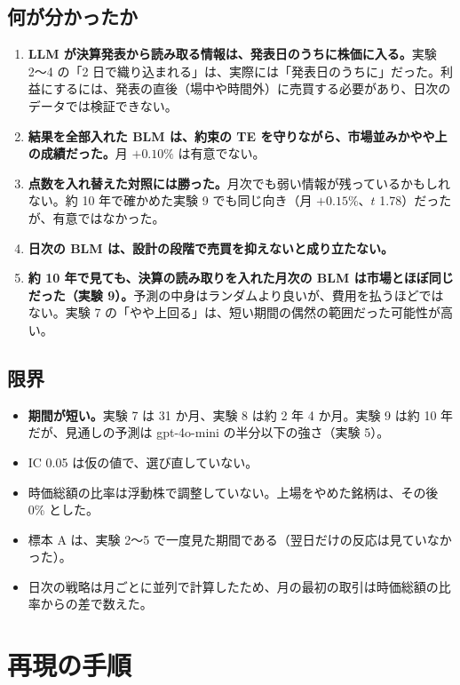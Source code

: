 \documentclass[xelatex,ja=standard,jafont=haranoaji,a4paper,10pt,openany]{bxjsreport}
\begin{document}
\section{何が分かったか}

\begin{enumerate}
\item \textbf{LLM が決算発表から読み取る情報は、発表日のうちに株価に入る。}実験 2〜4 の「2 日で織り込まれる」は、実際には「発表日のうちに」だった。利益にするには、発表の直後（場中や時間外）に売買する必要があり、日次のデータでは検証できない。
\item \textbf{結果を全部入れた BLM は、約束の TE を守りながら、市場並みかやや上の成績だった。}月 $+0.10\%$ は有意でない。
\item \textbf{点数を入れ替えた対照には勝った。}月次でも弱い情報が残っているかもしれない。約 10 年で確かめた実験 9 でも同じ向き（月 $+0.15\%$、$t$ 1.78）だったが、有意ではなかった。
\item \textbf{日次の BLM は、設計の段階で売買を抑えないと成り立たない。}
\item \textbf{約 10 年で見ても、決算の読み取りを入れた月次の BLM は市場とほぼ同じだった（実験 9）。}予測の中身はランダムより良いが、費用を払うほどではない。実験 7 の「やや上回る」は、短い期間の偶然の範囲だった可能性が高い。
\end{enumerate}

\section{限界}

\begin{itemize}
\item \textbf{期間が短い。}実験 7 は 31 か月、実験 8 は約 2 年 4 か月。実験 9 は約 10 年だが、見通しの予測は gpt-4o-mini の半分以下の強さ（実験 5）。
\item IC 0.05 は仮の値で、選び直していない。
\item 時価総額の比率は浮動株で調整していない。上場をやめた銘柄は、その後 0\% とした。
\item 標本 A は、実験 2〜5 で一度見た期間である（翌日だけの反応は見ていなかった）。
\item 日次の戦略は月ごとに並列で計算したため、月の最初の取引は時価総額の比率からの差で数えた。
\end{itemize}

\chapter*{再現の手順}
\end{document}

